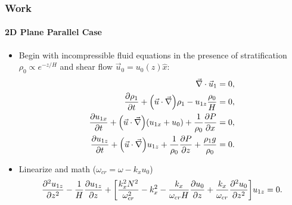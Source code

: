 \documentclass[dvipsnames]{beamer}
\newcommand*{\pd}[2]{\frac{\partial#1}{\partial#2}}
\newcommand*{\ptd}[2]{\frac{\partial^2 #1}{\partial#2^2}}
\DeclarePairedDelimiter\p{\lparen}{\rparen}
\DeclarePairedDelimiter\s{\lbrack}{\rbrack}
\begin{document}
\begin{frame}
    \frametitle{Work}
    \framesubtitle{2D Plane Parallel Case}

    \begin{itemize}
        \item Begin with incompressible fluid equations in the presence of
            stratification $\rho_0 \propto e^{-z/H}$ and shear flow $\vec{u}_0 =
            u_0(z)\hat{x}$:
            \begin{subequations}
                \begin{align}
                    \vec{\nabla} \cdot \vec{u}_1 &= 0,\\
                    \pd{\rho_1}{t} + \p*{\vec{u} \cdot \vec{\nabla}}\rho_1
                        - u_{1z}\frac{\rho_0}{H} &= 0,\\
                    \pd{u_{1x}}{t} + \p*{\vec{u} \cdot \vec{\nabla}}\p*{u_{1x} +
                        u_0} + \frac{1}{\rho_0}\pd{P}{x} &= 0,\\
                    \pd{u_{1z}}{t} + \p*{\vec{u} \cdot \vec{\nabla}}u_{1z} +
                        \frac{1}{\rho_0}\pd{P}{z} + \frac{\rho_1 g}{\rho_0} &= 0.
                \end{align}
            \end{subequations}

        \item Linearize and math ($\omega_{cr} = \omega - k_xu_0$)
            \begin{equation}
                \ptd{u_{1z}}{z} - \frac{1}{H}\pd{u_{1z}}{z} + \s*{
                    \frac{k_x^2N^2}{\omega_{cr}^2}
                        - k_x^2
                        - \frac{k_x}{\omega_{cr}H}\pd{u_0}{z}
                        + \frac{k_x}{\omega_{cr}} \ptd{u_0}{z}
                } u_{1z} = 0. \label{eq:shear_lin_uz}
            \end{equation}
    \end{itemize}
\end{frame}
\end{document}
